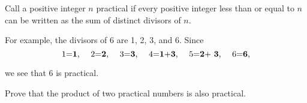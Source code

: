 Call a positive integer $n$ practical if every positive integer less than or equal to $n$ can be written as the sum of distinct divisors of $n$.

For example, the divisors of 6 are 1, 2, 3, and 6. Since\[ \centerline{1={\bf 1}, ~~ 2={\bf 2}, ~~ 3={\bf 3}, ~~ 4={\bf 1}+{\bf 3}, ~~ 5={\bf 2}+ {\bf 3}, ~~ 6={\bf 6},} \]

we see that 6 is practical.

Prove that the product of two practical numbers is also practical.